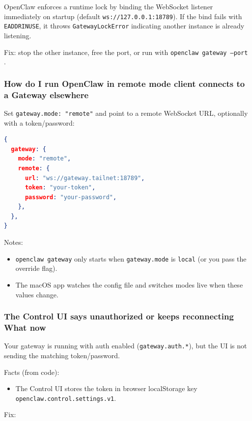 OpenClaw enforces a runtime lock by binding the WebSocket listener immediately on startup (default \texttt{ws://127.0.0.1:18789}). If the bind fails with \texttt{EADDRINUSE}, it throws \texttt{GatewayLockError} indicating another instance is already listening.

Fix: stop the other instance, free the port, or run with \texttt{openclaw gateway --port }.

\subsubsection{How do I run OpenClaw in remote mode client connects to a Gateway elsewhere}


Set \texttt{gateway.mode: "remote"} and point to a remote WebSocket URL, optionally with a token/password:

\begin{lstlisting}[language=json]
{
  gateway: {
    mode: "remote",
    remote: {
      url: "ws://gateway.tailnet:18789",
      token: "your-token",
      password: "your-password",
    },
  },
}
\end{lstlisting}


Notes:

\begin{itemize}
  \item \texttt{openclaw gateway} only starts when \texttt{gateway.mode} is \texttt{local} (or you pass the override flag).
  \item The macOS app watches the config file and switches modes live when these values change.
\end{itemize}


\subsubsection{The Control UI says unauthorized or keeps reconnecting What now}


Your gateway is running with auth enabled (\texttt{gateway.auth.*}), but the UI is not sending the matching token/password.

Facts (from code):

\begin{itemize}
  \item The Control UI stores the token in browser localStorage key \texttt{openclaw.control.settings.v1}.
\end{itemize}


Fix:

